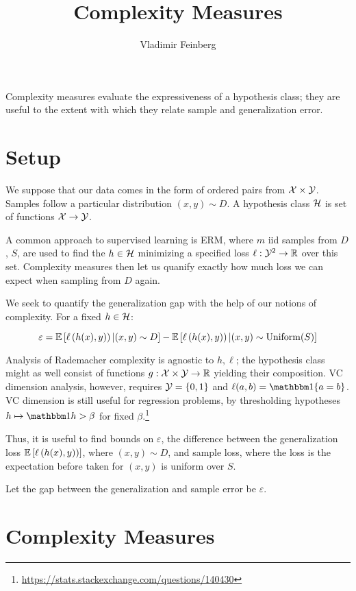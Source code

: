 \documentclass{article}
\title{Complexity Measures}
\author{Vladimir Feinberg}
\begin{document}
\maketitle

Complexity measures evaluate the expressiveness of a hypothesis class; they are useful to the extent with which they relate sample and generalization error.

\section{Setup}

We suppose that our data comes in the form of ordered pairs from $\mathcal{X}\times \mathcal{Y}$. Samples follow a particular distribution $(x, y)\sim D$. A hypothesis class ${\mathcal{H}}$ is set of functions $\mathcal{X}\rightarrow\mathcal{Y}$.

A common approach to supervised learning is ERM, where $m$ iid samples from $D$, $S$, are used to find the $h\in{\mathcal{H}}$ minimizing a specified loss $\ell:\mathcal{Y}^2\rightarrow\mathbb{R}$ over this set. Complexity measures then let us quanify exactly how much loss we can expect when sampling from $D$ again.

We seek to quantify the generalization gap with the help of our notions of complexity. For a fixed $h\in {\mathcal{H}}$:

$$
\varepsilon= \operatorname{\mathbb{E}}\left[\ell\left({h(x), y)}\right)|(x,y)\sim D\right]-\operatorname{\mathbb{E}}\left[\ell\left({h(x), y)}\right)|(x,y)\sim \operatorname{Uniform}(S)\right]
$$

Analysis of Rademacher complexity is agnostic to $h,\ell$; the hypothesis class might as well consist of functions $g:\mathcal{X}\times\mathcal{Y}\rightarrow\mathbb{R}$ yielding their composition. VC dimension analysis, however, requires $\mathcal{Y}=\{0, 1\}$ and $\ell(a, b)=\indicator\{a=b\}$. VC dimension is still useful for regression problems, by thresholding hypotheses $h\mapsto \indicator{h>\beta}$ for fixed $\beta$.\footnote{\url{https://stats.stackexchange.com/questions/140430}}


Thus, it is useful to find bounds on $\varepsilon$, the difference between the generalization loss $\operatorname{\mathbb{E}}\left[\ell\left({h(x), y)}\right)\right]$, where $(x,y)\sim D$, and sample loss, where the loss is the expectation before taken for $(x,y)$ is uniform over $S$.

Let the gap between the generalization and sample error be $\varepsilon$.

\section{Complexity Measures}
\end{document}
